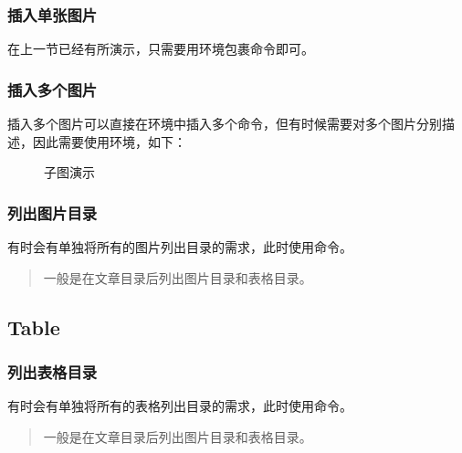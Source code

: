     \subsubsection{插入单张图片}
    在上一节已经有所演示，只需要用环境包裹命令即可。
    
    \subsubsection{插入多个图片}
    插入多个图片可以直接在环境中插入多个命令，但有时候需要对多个图片分别描述，因此需要使用环境，如下：
    \begin{texshow}
        \begin{figure}[H]
            \caption{子图演示}
            \label{fig:sub-figure-show}
        \end{figure}
    \end{texshow}
    
    

    \subsubsection{列出图片目录}
    有时会有单独将所有的图片列出目录的需求，此时使用命令。
    
    \begin{quotation}
        一般是在文章目录后列出图片目录和表格目录。
    \end{quotation}
    
    
    
    \subsection{Table}\label{sub:table}
    
    \subsubsection{列出表格目录}
    有时会有单独将所有的表格列出目录的需求，此时使用命令。
    
    \begin{quotation}
        一般是在文章目录后列出图片目录和表格目录。
    \end{quotation}
